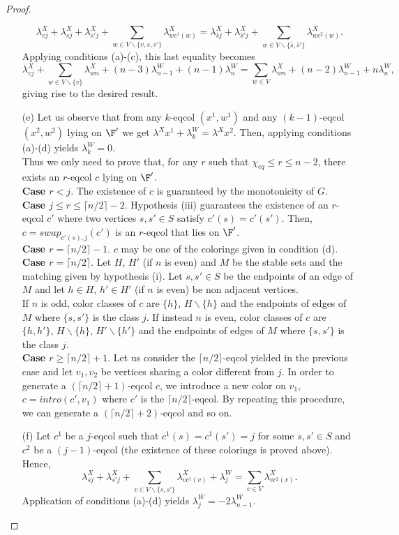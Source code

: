 \begin{proof}
\begin{enumerate}
\[ \lambda^X_{vj} + \lambda^X_{sj} + \lambda^X_{s'j} +
   \sum_{w \in V \backslash \{v, s, s'\}} \lambda^X_{w c^1(w)}
	= \lambda^X_{\hat{s}j} + \lambda^X_{\hat{s}'j} +
   \sum_{w \in V \backslash \{\hat{s}, \hat{s}'\}} \lambda^X_{w c^2(w)}. \]
Applying conditions (a)-(c), this last equality becomes
\[ \lambda^X_{vj} + \sum_{w \in V \backslash \{v\}} \lambda^X_{w n} + (n-3) \lambda^W_{n-1}
+ (n-1) \lambda^W_n = \sum_{w \in V} \lambda^X_{w n} + (n-2) \lambda^W_{n-1} + n \lambda^W_n,\]
giving rise to the desired result.
\item[(e)] Let us observe that from any $k$-eqcol $(x^1,w^1)$ and any $(k-1)$-eqcol
$(x^2,w^2)$ lying on $\F'$ we get $\lambda^X x^1 + \lambda^W_k = \lambda^X x^2$.
Then, applying conditions (a)-(d) yields $\lambda^W_k = 0$.\\
Thus we only need to prove that, for any $r$ such that $\chi_{eq} \leq r \leq n-2$, there exists an $r$-eqcol $c$
lying on $\F'$.\\
\textbf{Case $r < j$}. The existence of $c$ is guaranteed by the monotonicity of $G$.\\
\textbf{Case $j \leq r \leq \lceil n/2 \rceil-2$}. Hypothesis (iii) guarantees the existence of an $r$-eqcol $c'$
where two vertices $s, s' \in S$ satisfy $c'(s) = c'(s')$. Then, $c = swap_{c'(s),j}(c')$ is an $r$-eqcol that lies
on $\F'$.\\
\textbf{Case $r = \lceil n/2 \rceil-1$}. $c$ may be one of the colorings given in condition (d).\\
\textbf{Case $r = \lceil n/2 \rceil$}. Let $H$, $H'$ (if $n$ is even) and $M$ be the stable sets and the matching
given by hypothesis (i). Let $s, s' \in S$ be the endpoints of an edge of $M$ and let $h \in H$, $h' \in H'$ (if $n$
is even) be non adjacent vertices.\\
If $n$ is odd, color classes of $c$ are $\{h\}$, $H \backslash \{h\}$ and the endpoints of edges of $M$ where
$\{s,s'\}$ is the class $j$. If instead $n$ is even, color classes of $c$ are $\{h,h'\}$, $H \backslash \{h\}$,
$H' \backslash \{h'\}$ and the endpoints of edges of $M$ where $\{s,s'\}$ is the class $j$.\\
\textbf{Case $r \geq \lceil n/2 \rceil+1$}. Let us consider the $\lceil n/2 \rceil$-eqcol yielded in the
previous case and let $v_1, v_2$ be vertices sharing a color different from $j$.
In order to generate a $(\lceil n/2 \rceil + 1)$-eqcol $c$, we introduce a new color on $v_1$, \ie $c = intro(c', v_1)$
where $c'$ is the $\lceil n/2 \rceil$-eqcol. By repeating this procedure, we can generate a
$(\lceil n/2 \rceil + 2)$-eqcol and so on.
\item[(f)] Let $c^1$ be a $j$-eqcol such that $c^1(s) = c^1(s') = j$ for some $s, s' \in S$ and
$c^2$ be a $(j-1)$-eqcol (the existence of these colorings is proved above). Hence,
\[ \lambda^X_{sj} + \lambda^X_{s'j} +
   \sum_{v \in V \backslash \{s, s'\}} \lambda^X_{v c^1(v)} + \lambda^W_j
	= \sum_{v \in V} \lambda^X_{v c^2(v)}. \]
Application of conditions (a)-(d) yields $\lambda^W_j = - 2 \lambda^W_{n-1}$.
\end{enumerate}
\end{proof}


